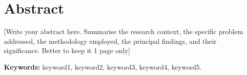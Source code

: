 
\chapter*{Abstract}
\thispagestyle{plain}


[Write your abstract here. Summarise the research context, the specific problem
addressed, the methodology employed, the principal findings, and their significance. Better to keep it 1 page only]

\medskip
\noindent\textbf{Keywords:} keyword1, keyword2, keyword3, keyword4, keyword5.
